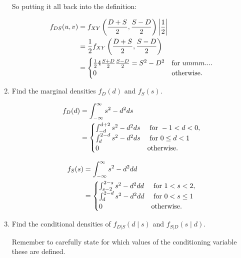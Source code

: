 \documentclass{article}
\newcommand{\1}{\mathbf{1}}
\begin{document}
\begin{enumerate}
    So putting it all back into the definition:
    
    \begin{align*}
     f_{DS}(u,v) &= f_{XY}\left(\frac{D + S}{2}, \frac{S - D}{2}\right) \bigg|\frac{1}{2}\bigg| \\
     &= \frac{1}{2} f_{XY}\left(\frac{D + S}{2}, \frac{S - D}{2}\right) \\
     &= \begin{cases}
        \frac{1}{2} 4\frac{S+D}{2}\frac{S-D}{2} = S^2-D^2 & \hbox{for } ummm....\\ 
        0 & \hbox{otherwise.}
        \end{cases}
    \end{align*}

    \newpage
    \item Find the marginal densities $f_D(d)$ and $f_S(s)$.
    
    \begin{align*}
    f_{D}(d) &= \int_{-\infty}^\infty s^2 - d^2 ds \\
    &= \begin{cases}
       \int_{-d}^{d+2} s^2 - d^2 ds &\hbox{ for } -1 < d < 0, \\
       \int_{d}^{2-d} s^2 - d^2 ds  &\hbox{ for } 0\leq d < 1 \\
       0 &\hbox{otherwise.}
       \end{cases}
    \end{align*}
    
    \begin{align*}
    f_{S}(s) &= \int_{-\infty}^\infty s^2 - d^2 dd \\
    &= \begin{cases}
       \int_{s-2}^{2-s} s^2 - d^2 dd &\hbox{ for } 1 < s < 2, \\
       \int_{d}^{2-d} s^2 - d^2 dd  &\hbox{ for } 0 < s\leq 1 \\
       0 &\hbox{otherwise.}
       \end{cases}
    \end{align*}
    
    
    \item Find the conditional densities of $f_{D|S}(d\mid s)$ and $f_{S|D}(s\mid d)$.\par
    Remember to carefully state for which values of the conditioning variable these are defined.
    
    
\end{enumerate}
\end{document}
